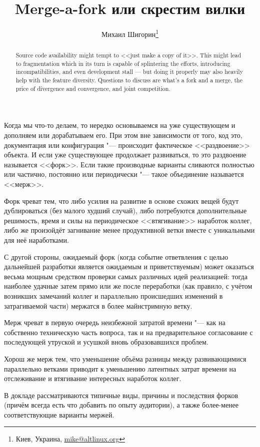 \documentclass[10pt, a5paper]{article}
\begin{document}
\title{Merge-a-fork или скрестим вилки}
\author{Михаил Шигорин\footnote{Киев, Украина, \url{mike@altlinux.org}}}
\date{}
\maketitle

\begin{abstract}
Source code availability might tempt to <<just make a copy of it>>. This might lead to fragmentation which in its turn is capable of splintering the efforts, introducing incompatibilities, and even development stall --- but doing it properly may also heavily help with the feature diversity.
Questions to discuss are what's a fork and a merge, the price of divergence and convergence, and joint competition.
\end{abstract}

Когда мы что-то делаем, то нередко основываемся на уже существующем и дополняем или дорабатываем его. При этом вне зависимости от того, код это, документация или конфигурация "--- происходит фактическое <<раздвоение>> объекта. И если уже существующее продолжает развиваться, то это раздвоение называется <<форк>>. Если такие производные варианты сливаются полностью или частично, постоянно или периодически "--- такое объединение называется <<мерж>>.

Форк чреват тем, что либо усилия на развитие в основе схожих вещей будут дублироваться (без малого худший случай), либо потребуются дополнительные решимость, время и силы на периодическое <<втягивание>> наработок коллег, либо же произойдёт загнивание менее продуктивной ветки вместе с уникальными для неё наработками.

С другой стороны, ожидаемый форк (когда событие ответвления с целью дальнейшей разработки является ожидаемым и приветствуемым) может оказаться весьма мощным средством проверки самых различных идей реализацией: тогда наиболее удачные затем прямо или же после переработки (как правило, с учётом возникших замечаний коллег и параллельно происшедших изменений в затрагиваемой части) мержатся в более майнстримную ветку.

Мерж чреват в первую очередь неизбежной затратой времени "--- как на собственно техническую часть вопроса, так и на предварительное согласование с последующей утруской и усушкой вновь образовавшихся проблем.

Хорош же мерж тем, что уменьшение объёма разницы между развивающимися параллельно ветками приводит к уменьшению латентных затрат времени на отслеживание и втягивание интересных наработок коллег.

В докладе рассматриваются типичные виды, причины и последствия форков (причём всегда есть что добавить по опыту аудитории), а также более-менее соответствующие варианты мержей.
\end{document}
